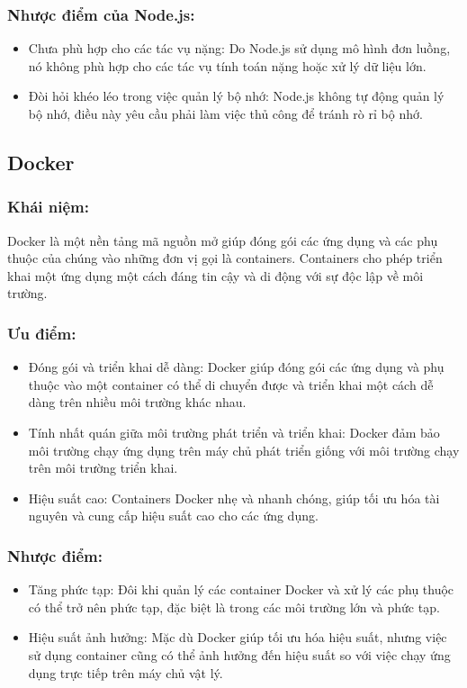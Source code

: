 \subsubsection{Nhược điểm của Node.js:}
\begin{itemize}
    \item Chưa phù hợp cho các tác vụ nặng: Do Node.js sử dụng mô hình đơn luồng, nó không phù hợp cho các tác vụ tính toán nặng hoặc xử lý dữ liệu lớn.
    \item Đòi hỏi khéo léo trong việc quản lý bộ nhớ: Node.js không tự động quản lý bộ nhớ, điều này yêu cầu phải làm việc thủ công để tránh rò rỉ bộ nhớ.
\end{itemize}
\subsection{Docker}
\subsubsection{Khái niệm:}
\indent Docker là một nền tảng mã nguồn mở giúp đóng gói các ứng dụng và các phụ thuộc của chúng vào những đơn vị gọi là containers. Containers cho phép triển khai một ứng dụng một cách đáng tin cậy và di động với sự độc lập về môi trường.
\subsubsection{Ưu điểm:}
\begin{itemize}
    \item Đóng gói và triển khai dễ dàng: Docker giúp đóng gói các ứng dụng và phụ thuộc vào một container có thể di chuyển được và triển khai một cách dễ dàng trên nhiều môi trường khác nhau.
    \item Tính nhất quán giữa môi trường phát triển và triển khai: Docker đảm bảo môi trường chạy ứng dụng trên máy chủ phát triển giống với môi trường chạy trên môi trường triển khai.
    \item Hiệu suất cao: Containers Docker nhẹ và nhanh chóng, giúp tối ưu hóa tài nguyên và cung cấp hiệu suất cao cho các ứng dụng.
\end{itemize}
\subsubsection{Nhược điểm:}
\begin{itemize}
    \item Tăng phức tạp: Đôi khi quản lý các container Docker và xử lý các phụ thuộc có thể trở nên phức tạp, đặc biệt là trong các môi trường lớn và phức tạp.
    \item Hiệu suất ảnh hưởng: Mặc dù Docker giúp tối ưu hóa hiệu suất, nhưng việc sử dụng container cũng có thể ảnh hưởng đến hiệu suất so với việc chạy ứng dụng trực tiếp trên máy chủ vật lý.
\end{itemize}

